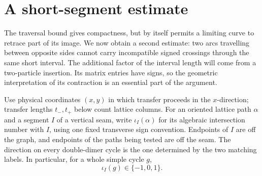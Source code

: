 \section{A short-segment estimate}
\label{sec:short-segment}

The traversal bound gives compactness, but by itself permits a limiting
curve to retrace part of its image.  We now obtain a second estimate: two
arcs travelling between opposite sides cannot carry incompatible signed
crossings through the same short interval.  The additional factor of the
interval length will come from a two-particle insertion.  Its matrix
entries have signs, so the geometric interpretation of its contraction
is an essential part of the argument.

Use physical coordinates $(x,y)$ in which transfer proceeds in the
$x$-direction; transfer lengths $t_-,t_+$ below count lattice columns.
For an oriented lattice path $\alpha$ and a segment $I$ of a vertical seam,
write $\iota_I(\alpha)$ for its algebraic intersection number with $I$,
using one fixed transverse sign convention.  Endpoints of $I$ are off the
graph, and endpoints of the paths being tested are off the seam.  The
direction on every double-dimer cycle is the one determined by the two
matching labels.  In particular, for a whole simple cycle $g$,
\begin{equation}
 \iota_I(g)\in\{-1,0,1\}.
 \label{eq:whole-loop-index}
\end{equation}

